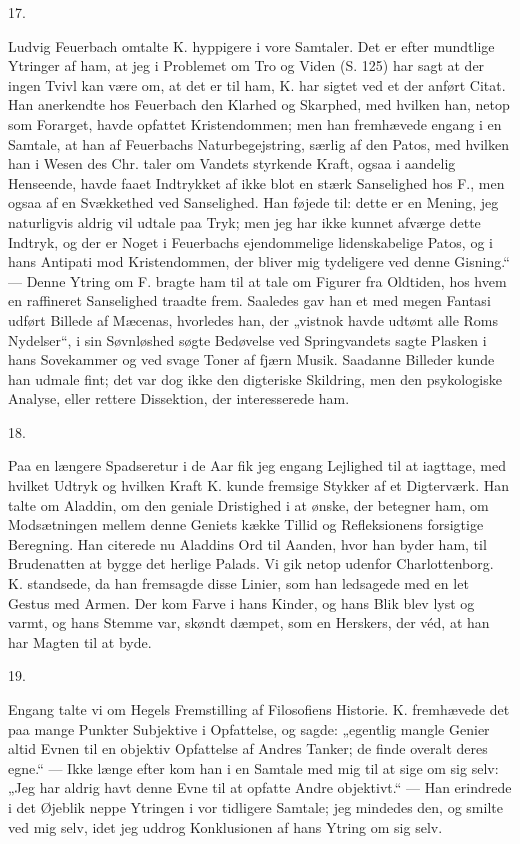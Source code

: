 \documentclass[12pt,a4paper,openany]{book}
\newcommand{\secnum}[1]{\par\begin{center}#1\end{center}\par\nobreak}
\newcommand{\opage}[1]{\marginnote{\footnotesize\textit{[#1]}}}
\begin{document}
\secnum{17.}

Ludvig Feuerbach omtalte K. hyppigere i vore Samtaler. Det er
efter mundtlige Ytringer af ham, at jeg i Problemet om Tro og
Viden (S. 125) har sagt at der ingen Tvivl kan være om, at det er
til ham, K. har
\opage{350}sigtet ved et der anført Citat. Han anerkendte hos
Feuerbach den Klarhed og Skarphed, med hvilken han, netop som
Forarget, havde opfattet Kristendommen; men han fremhævede engang
i en Samtale, at han af Feuerbachs Naturbegejstring, særlig af den
Patos, med hvilken han i Wesen des Chr. taler om Vandets styrkende
Kraft, ogsaa i aandelig Henseende, havde faaet Indtrykket af ikke
blot en stærk Sanselighed hos F., men ogsaa af en Svækkethed ved
Sanselighed. Han føjede til:
dette er en Mening, jeg naturligvis aldrig vil udtale paa Tryk;
men jeg har ikke kunnet afværge dette Indtryk, og der er Noget i
Feuerbachs ejendommelige lidenskabelige Patos, og i hans Antipati
mod Kristendommen, der bliver mig tydeligere ved denne Gisning.“
--- Denne Ytring om F. bragte ham til at tale om Figurer fra
Oldtiden, hos hvem en raffineret Sanselighed traadte frem.
Saaledes gav han et med megen Fantasi udført Billede af Mæcenas,
hvorledes han, der „vistnok havde udtømt alle Roms Nydelser“, i
sin Søvnløshed søgte Bedøvelse ved Springvandets sagte Plasken i
hans Sovekammer og ved svage Toner af fjærn Musik. Saadanne
Billeder kunde han udmale fint; det var dog ikke den digteriske
Skildring, men den psykologiske Analyse, eller rettere Dissektion,
der interesserede ham.

\secnum{18.}

Paa en længere Spadseretur i de Aar fik jeg engang Lejlighed til
at iagttage, med hvilket Udtryk og hvilken Kraft K. kunde fremsige
Stykker af et Digterværk. Han talte om Aladdin, om den geniale
Dristighed i at ønske, der betegner ham, om Modsætningen mellem
denne Geniets kække Tillid og Refleksionens forsigtige Beregning.
Han citerede nu Aladdins Ord til Aanden, hvor han byder ham, til
Brudenatten at bygge det herlige Palads. Vi gik netop udenfor
Charlottenborg. K. standsede, da han fremsagde disse Linier, som
han ledsagede med
\opage{351}en let Gestus med Armen. Der kom Farve i hans Kinder,
og hans Blik blev lyst og varmt, og hans Stemme var, skøndt
dæmpet, som en Herskers, der véd, at han har Magten til at byde.

\secnum{19.}

Engang talte vi om Hegels Fremstilling af Filosofiens Historie. K.
fremhævede det paa mange Punkter Subjektive i Opfattelse, og
sagde: „egentlig mangle Genier altid Evnen til en objektiv
Opfattelse af Andres Tanker; de finde overalt deres egne.“ ---
Ikke længe efter kom han i en Samtale med mig til at sige om sig
selv: „Jeg har aldrig havt denne Evne til at opfatte Andre
objektivt.“ --- Han erindrede i det Øjeblik neppe Ytringen i vor
tidligere Samtale; jeg mindedes den, og smilte ved mig selv, idet
jeg uddrog Konklusionen af hans Ytring om sig selv.
\end{document}
